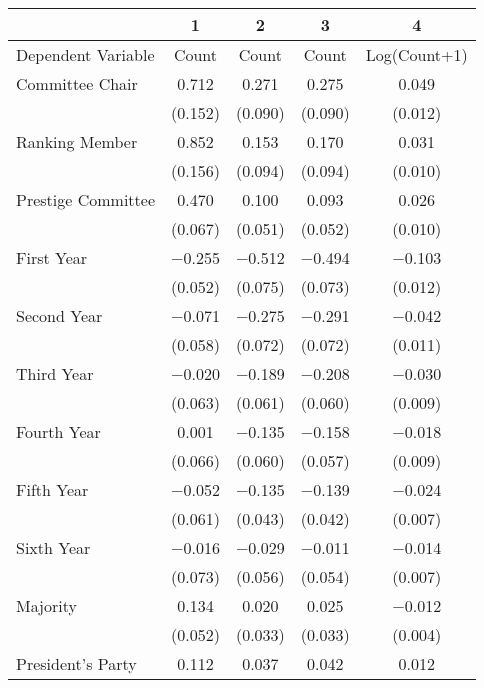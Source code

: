 \begin{table}
\centering
\begin{tabular}[t]{lcccc}
\toprule
  & 1 & 2 & 3 & 4\\
\midrule
Dependent Variable & Count & Count & Count & Log(Count+1)\\
Committee Chair & \num{0.712} & \num{0.271} & \num{0.275} & \num{0.049}\\
 & (\num{0.152}) & (\num{0.090}) & (\num{0.090}) & (\num{0.012})\\
Ranking Member & \num{0.852} & \num{0.153} & \num{0.170} & \num{0.031}\\
 & (\num{0.156}) & (\num{0.094}) & (\num{0.094}) & (\num{0.010})\\
Prestige Committee & \num{0.470} & \num{0.100} & \num{0.093} & \num{0.026}\\
 & (\num{0.067}) & (\num{0.051}) & (\num{0.052}) & (\num{0.010})\\
First Year & \num{-0.255} & \num{-0.512} & \num{-0.494} & \num{-0.103}\\
 & (\num{0.052}) & (\num{0.075}) & (\num{0.073}) & (\num{0.012})\\
Second Year & \num{-0.071} & \num{-0.275} & \num{-0.291} & \num{-0.042}\\
 & (\num{0.058}) & (\num{0.072}) & (\num{0.072}) & (\num{0.011})\\
Third Year & \num{-0.020} & \num{-0.189} & \num{-0.208} & \num{-0.030}\\
 & (\num{0.063}) & (\num{0.061}) & (\num{0.060}) & (\num{0.009})\\
Fourth Year & \num{0.001} & \num{-0.135} & \num{-0.158} & \num{-0.018}\\
 & (\num{0.066}) & (\num{0.060}) & (\num{0.057}) & (\num{0.009})\\
Fifth Year & \num{-0.052} & \num{-0.135} & \num{-0.139} & \num{-0.024}\\
 & (\num{0.061}) & (\num{0.043}) & (\num{0.042}) & (\num{0.007})\\
Sixth Year & \num{-0.016} & \num{-0.029} & \num{-0.011} & \num{-0.014}\\
 & (\num{0.073}) & (\num{0.056}) & (\num{0.054}) & (\num{0.007})\\
Majority & \num{0.134} & \num{0.020} & \num{0.025} & \num{-0.012}\\
 & (\num{0.052}) & (\num{0.033}) & (\num{0.033}) & (\num{0.004})\\
President's Party & \num{0.112} & \num{0.037} & \num{0.042} & \num{0.012}\\

\end{tabular}
\end{table}
